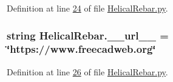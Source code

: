 Definition at line \hyperlink{HelicalRebar_8py_source_l00024}{24} of file \hyperlink{HelicalRebar_8py_source}{Helical\+Rebar.\+py}.

\subsubsection[{\texorpdfstring{\+\_\+\+\_\+url\+\_\+\+\_\+}{__url__}}]{\setlength{\rightskip}{0pt plus 5cm}string Helical\+Rebar.\+\_\+\+\_\+url\+\_\+\+\_\+ = \char`\"{}https\+://www.\+freecadweb.\+org\char`\"{}\hspace{0.3cm}{\ttfamily [private]}}\hypertarget{namespaceHelicalRebar_a9c74e4634d00eef07ed630054e69fbff}{}\label{namespaceHelicalRebar_a9c74e4634d00eef07ed630054e69fbff}


Definition at line \hyperlink{HelicalRebar_8py_source_l00026}{26} of file \hyperlink{HelicalRebar_8py_source}{Helical\+Rebar.\+py}.

